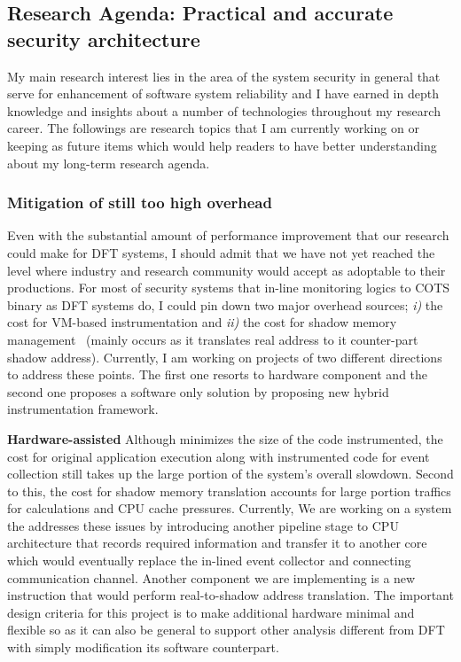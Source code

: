 \documentclass[letterpaper, 10pt]{article}
\begin{document}
\begin{small}
\subsection*{Research Agenda: Practical and accurate security architecture}
%
My main research interest lies in the area of the system security in general
that serve for enhancement of software system reliability and I have earned in
depth knowledge and insights about a number of technologies throughout my
research career.
%
The followings are research topics that I am currently working on or keeping as
future items which would help readers to have better understanding about my
long-term research agenda.
%
\subsubsection*{Mitigation of still too high overhead}
%
Even with the substantial amount of performance improvement that our research
could make for DFT systems, I should admit that we have not yet reached the
level where industry and research community would accept as adoptable to their
productions.
%
For most of security systems that in-line monitoring logics to COTS binary as
DFT systems do, I could pin down two major overhead sources; {\it i)} the cost
for VM-based instrumentation and {\it ii)} the cost for shadow memory
management ~(mainly occurs as it translates real address to it counter-part
shadow address).
%
Currently, I am working on projects of two different directions to address
these points. The first one resorts to hardware component and the second one
proposes a software only solution by proposing new hybrid instrumentation
framework.

{\bf Hardware-assisted \SR} Although \SR minimizes the size of the code
instrumented, the cost for original application execution along with
instrumented code for event collection still takes up the large portion of the
system's overall slowdown. Second to this, the cost for shadow memory
translation accounts for large portion traffics for calculations and CPU cache
pressures.
%
Currently, We are working on a system the addresses these issues by introducing
another pipeline stage to CPU architecture that records required information
and transfer it to another core which would eventually replace the in-lined
event collector and connecting communication channel. Another component we are
implementing is a new instruction that would perform real-to-shadow address
translation. The important design criteria for this project is to make
additional hardware minimal and flexible so as it can also be general to
support other analysis different from DFT with simply modification its software
counterpart.


\end{small}
\end{document}
